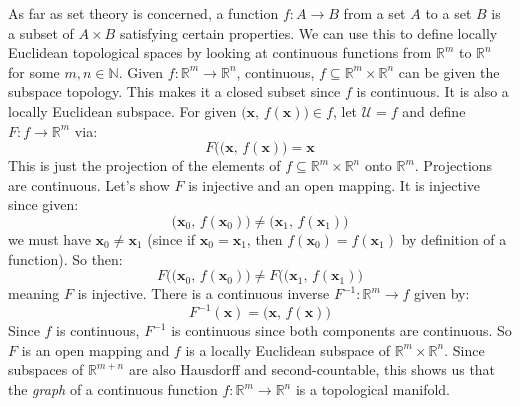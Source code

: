 \documentclass{article}
\theoremstyle{plain}
\theoremstyle{normal}
\newenvironment{example}{%
    \pushQED{\qed}\renewcommand{\qedsymbol}{$\blacksquare$}\examplex%
}{%
    \popQED\endexamplex%
}
\begin{document}
        \begin{example}
            As far as set theory is concerned, a function
            $f:A\rightarrow{B}$ from a set $A$ to a set $B$ is a subset of
            $A\times{B}$ satisfying certain properties. We can use this to
            define locally Euclidean topological spaces by looking at
            continuous functions from $\mathbb{R}^{m}$ to $\mathbb{R}^{n}$ for
            some $m,n\in\mathbb{N}$. Given
            $f:\mathbb{R}^{m}\rightarrow\mathbb{R}^{n}$, continuous,
            $f\subseteq\mathbb{R}^{m}\times\mathbb{R}^{n}$ can be given the
            subspace topology. This makes it a closed subset since $f$ is
            continuous. It is also a locally Euclidean subspace. For given
            $\big(\mathbf{x},\,f(\mathbf{x})\big)\in{f}$, let
            $\mathcal{U}=f$ and define $F:f\rightarrow\mathbb{R}^{m}$ via:
            \begin{equation}
                F\big((\mathbf{x},\,f(\mathbf{x})\big)=\mathbf{x}
            \end{equation}
            This is just the projection of the elements of
            $f\subseteq\mathbb{R}^{m}\times\mathbb{R}^{n}$ onto
            $\mathbb{R}^{m}$. Projections are continuous. Let's show
            $F$ is injective and an open mapping. It is injective since given:
            \begin{equation}
                \big(\mathbf{x}_{0},\,f(\mathbf{x}_{0})\big)
                \ne\big(\mathbf{x}_{1},\,f(\mathbf{x}_{1})\big)
            \end{equation}
            we must have $\mathbf{x}_{0}\ne\mathbf{x}_{1}$ (since if
            $\mathbf{x}_{0}=\mathbf{x}_{1}$, then
            $f(\mathbf{x}_{0})=f(\mathbf{x}_{1})$ by definition of a function).
            So then:
            \begin{equation}
                F\big((\mathbf{x}_{0},\,f(\mathbf{x}_{0})\big)
                \ne{F}\big((\mathbf{x}_{1},\,f(\mathbf{x}_{1})\big)
            \end{equation}
            meaning $F$ is injective. There is a continuous inverse
            $F^{-1}:\mathbb{R}^{m}\rightarrow{f}$ given by:
            \begin{equation}
                F^{-1}(\mathbf{x})
                =\big(\mathbf{x},\,f(\mathbf{x})\big)
            \end{equation}
            Since $f$ is continuous, $F^{-1}$ is continuous since both
            components are continuous. So $F$ is an open mapping and $f$
            is a locally Euclidean subspace of
            $\mathbb{R}^{m}\times\mathbb{R}^{n}$. Since subspaces of
            $\mathbb{R}^{m+n}$ are also Hausdorff and second-countable, this
            shows us that the \textit{graph} of a continuous function
            $f:\mathbb{R}^{m}\rightarrow\mathbb{R}^{n}$ is a topological
            manifold.
        \end{example}
\end{document}
